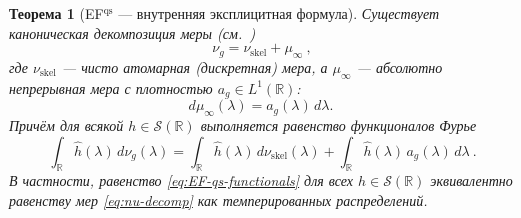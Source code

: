 \documentclass{article}
\numberwithin{equation}{section}
\theoremstyle{plain}
\newtheorem{theorem}{Теорема}
\theoremstyle{definition}
\theoremstyle{remark}
\def\infty{∞}\def\partial{∂}\def\sum{Σ}\def\int{∫}%
\begin{document}
\begin{theorem}[EF$^{\mathrm{qs}}$ — внутренняя эксплицитная формула]
\label{thm:EFqs}
Существует каноническая декомпозиция меры (см.~\cite{Halmos1974})
\begin{equation}
\label{eq:nu-decomp}
\boxed{\ \nu_g=\nu_{\mathrm{skel}}+\mu_\infty\ },
\end{equation}
где $\nu_{\mathrm{skel}}$ — чисто атомарная (дискретная) мера, а $\mu_\infty$ — абсолютно непрерывная мера с плотностью $a_g\in L^1(\mathbb R)$:
\begin{equation}
\label{eq:mu-infty}
d\mu_\infty(\lambda)=a_g(\lambda)\,d\lambda.
\end{equation}
Причём для всякой $h\in\mathcal S(\mathbb R)$ выполняется равенство функционалов Фурье
\begin{equation}
\label{eq:EF-qs-functionals}
\boxed{\ \int_{\mathbb R}\widehat h(\lambda)\,d\nu_g(\lambda)
=\int_{\mathbb R}\widehat h(\lambda)\,d\nu_{\mathrm{skel}}(\lambda)
+\int_{\mathbb R}\widehat h(\lambda)\,a_g(\lambda)\,d\lambda\ .}
\end{equation}
В частности, равенство \eqref{eq:EF-qs-functionals} для всех $h\in\mathcal S(\mathbb R)$ эквивалентно равенству мер \eqref{eq:nu-decomp} как темперированных распределений.
\end{theorem}
\end{document}
